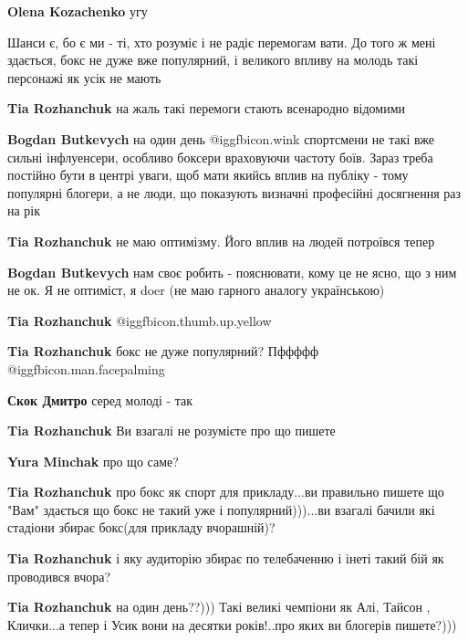 \begin{itemize}
\begin{itemize} %
\textbf{Olena Kozachenko} угу
\end{itemize} %


Шанси є, бо є ми - ті, хто розуміє і не радіє перемогам вати. До того ж мені
здається, бокс не дуже вже популярний, і великого впливу на молодь такі
персонажі як усік не мають

\begin{itemize} %
\textbf{Tia Rozhanchuk} на жаль такі перемоги стають всенародно відомими

\textbf{Bogdan Butkevych} на один день  @igg{fbicon.wink}  спортсмени не такі вже сильні інфлуенсери, особливо боксери враховуючи частоту боїв. Зараз треба постійно бути в центрі уваги, щоб мати якийсь вплив на публіку - тому популярні блогери, а не люди, що показують визначні професійні досягнення раз на рік

\textbf{Tia Rozhanchuk} не маю оптимізму. Його вплив на людей потроївся тепер

\textbf{Bogdan Butkevych} нам своє робить - пояснювати, кому це не ясно, що з ним не ок. Я не оптиміст, я doer (не маю гарного аналогу українською)

\textbf{Tia Rozhanchuk}  @igg{fbicon.thumb.up.yellow} 

\textbf{Tia Rozhanchuk} бокс не дуже популярний? Пффффф  @igg{fbicon.man.facepalming} 

\textbf{Скок Дмитро} серед молоді - так

\textbf{Tia Rozhanchuk} Ви взагалі не розумієте про що пишете

\textbf{Yura Minchak} про що саме?

\textbf{Tia Rozhanchuk} про бокс як спорт для прикладу...ви правильно пишете що "Вам" здається що бокс не такий уже і популярний)))...ви взагалі бачили які стадіони збирає бокс(для прикладу вчорашній)?

\textbf{Tia Rozhanchuk} і яку аудиторію збирає по телебаченню і інеті такий бій як проводився вчора?

\textbf{Tia Rozhanchuk} на один день??))) Такі великі чемпіони як Алі, Тайсон , Клички...а тепер і Усик вони на десятки років!..про яких ви блогерів пишете?)))


\end{itemize}
\end{itemize}
